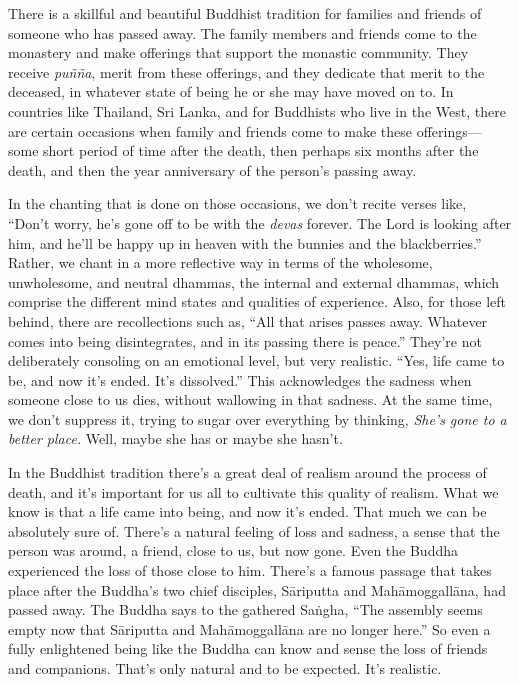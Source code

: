 
There is a skillful and beautiful Buddhist tradition for families and 
friends of someone who has passed away. The family members and friends 
come to the monastery and make offerings that support the monastic 
community. They receive \emph{puñña}, merit from these offerings, and 
they dedicate that merit to the deceased, in whatever state of being he 
or she may have moved on to. In countries like Thailand, Sri Lanka, and 
for Buddhists who live in the West, there are certain occasions when 
family and friends come to make these offerings---some short period of 
time after the death, then perhaps six months after the death, and then 
the year anniversary of the person's passing away.

In the chanting that is done on those occasions, we don't recite verses 
like, ``Don't worry, he's gone off to be with the \emph{devas} forever. 
The Lord is looking after him, and he'll be happy up in heaven with the 
bunnies and the blackberries.'' Rather, we chant in a more reflective 
way in terms of the wholesome, unwholesome, and neutral dhammas, the 
internal and external dhammas, which comprise the different mind states 
and qualities of experience. Also, for those left behind, there are 
recollections such as, ``All that arises passes away. Whatever comes 
into being disintegrates, and in its passing there is peace.'' They're 
not deliberately consoling on an emotional level, but very realistic. 
``Yes, life came to be, and now it's ended. It's dissolved.'' This 
acknowledges the sadness when someone close to us dies, without 
wallowing in that sadness. At the same time, we don't suppress it, 
trying to sugar over everything by thinking, \emph{She's gone to a 
better place.} Well, maybe she has or maybe she hasn't.

In the Buddhist tradition there's a great deal of realism around the 
process of death, and it's important for us all to cultivate this 
quality of realism. What we know is that a life came into being, and 
now it's ended. That much we can be absolutely sure of. There's a 
natural feeling of loss and sadness, a sense that the person was 
around, a friend, close to us, but now gone. Even the Buddha 
experienced the loss of those close to him. There's a famous passage 
that takes place after the Buddha's two chief disciples, Sāriputta and 
Mahāmoggallāna, had passed away. The Buddha says to the gathered 
Saṅgha, ``The assembly seems empty now that Sāriputta and 
Mahāmoggallāna are no longer here.'' So even a fully enlightened 
being like the Buddha can know and sense the loss of friends and 
companions. That's only natural and to be expected. It's realistic.

